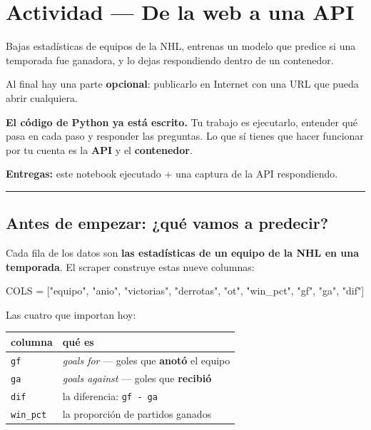 \documentclass[
]{article}
\author{}
\date{}
\newenvironment{Shaded}{}{}
\newcommand{\NormalTok}[1]{#1}
\newcommand{\OperatorTok}[1]{\textcolor[rgb]{0.40,0.40,0.40}{#1}}
\newcommand{\StringTok}[1]{\textcolor[rgb]{0.25,0.44,0.63}{#1}}
\newcounter{none} %
\begin{document}
\protect{}\label{J0YdC2xdnYx3}
\section{Actividad --- De la web a una
API}\label{actividad--de-la-web-a-una-api}

Bajas estadísticas de equipos de la NHL, entrenas un modelo que predice
si una temporada fue ganadora, y lo dejas respondiendo dentro de un
contenedor.

Al final hay una parte \textbf{opcional}: publicarlo en Internet con una
URL que pueda abrir cualquiera.

\textbf{El código de Python ya está escrito.} Tu trabajo es ejecutarlo,
entender qué pasa en cada paso y responder las preguntas. Lo que sí
tienes que hacer funcionar por tu cuenta es la \textbf{API} y el
\textbf{contenedor}.

\textbf{Entregas:} este notebook ejecutado + una captura de la API
respondiendo.

\protect{}\label{5TGWXZjUnYx-}
\begin{center}\rule{0.5\linewidth}{0.5pt}\end{center}

\subsection{Antes de empezar: ¿qué vamos a
predecir?}\label{antes-de-empezar-quuxe9-vamos-a-predecir}

Cada fila de los datos son \textbf{las estadísticas de un equipo de la
NHL en una temporada}. El scraper construye estas nueve columnas:

\begin{Shaded}
\begin{Highlighting}[]
\NormalTok{COLS }\OperatorTok{=}\NormalTok{ [}\StringTok{"equipo"}\NormalTok{, }\StringTok{"anio"}\NormalTok{, }\StringTok{"victorias"}\NormalTok{, }\StringTok{"derrotas"}\NormalTok{, }\StringTok{"ot"}\NormalTok{,}
        \StringTok{"win\_pct"}\NormalTok{, }\StringTok{"gf"}\NormalTok{, }\StringTok{"ga"}\NormalTok{, }\StringTok{"dif"}\NormalTok{]}
\end{Highlighting}
\end{Shaded}

Las cuatro que importan hoy:

{\def\LTcaptype{none} %
\begin{longtable}[]{@{}ll@{}}
\toprule\noalign{}
columna & qué es \\
\midrule\noalign{}
\endhead
\bottomrule\noalign{}
\endlastfoot
\texttt{gf} & \emph{goals for} --- goles que \textbf{anotó} el equipo \\
\texttt{ga} & \emph{goals against} --- goles que \textbf{recibió} \\
\texttt{dif} & la diferencia: \texttt{gf\ -\ ga} \\
\texttt{win\_pct} & la proporción de partidos ganados \\
\end{longtable}
}
\end{document}
